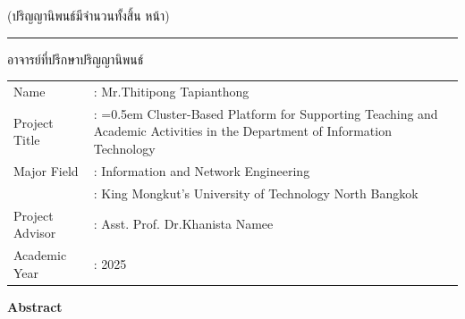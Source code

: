 \begin{flushright}
(ปริญญานิพนธ์มีจำนวนทั้งสิ้น \pageref{LastPage} หน้า)

\vfill
\rule{10 cm}{0.4pt} อาจารย์ที่ปรึกษาปริญญานิพนธ์ 

\end{flushright}





\newpage
{}
{}
\begin{tabularx}{\textwidth}{lX}
Name                    & : Mr.Thitipong Tapianthong  %
\\
Project Title           & : \hangindent=0.5em %
                            Cluster-Based Platform for Supporting Teaching and
                            Academic Activities in the Department of Information Technology  %
\\
Major Field             & : Information and Network Engineering %
\\
                        & : King Mongkut’s University of Technology North Bangkok
\\
Project Advisor         & : Asst. Prof. Dr.Khanista Namee   %
\\
Academic Year           & : 2025    %
\end{tabularx}

\vspace{5mm}
\begin{center}\textbf{Abstract}\end{center}

